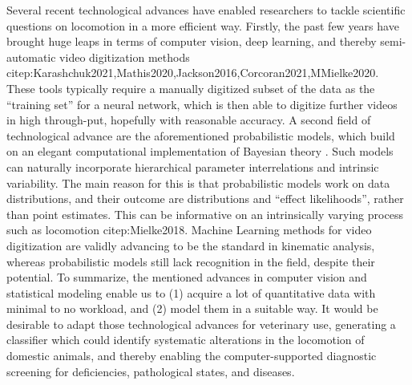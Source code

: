 Several recent technological advances have enabled researchers to tackle scientific questions on locomotion in a more efficient way.
Firstly, the past few years have brought huge leaps in terms of computer vision, deep learning, and thereby semi-automatic video digitization methods citep:Karashchuk2021,Mathis2020,Jackson2016,Corcoran2021,MMielke2020.
These tools typically require a manually digitized subset of the data as the ``training set'' for a neural network, which is then able to digitize further videos in high through-put, hopefully with reasonable accuracy.
A second field of technological advance are the aforementioned probabilistic models, which build on an elegant computational implementation of Bayesian theory \citep[Markov Chain Monte Carlo / MCMC sampling, \textit{cf.}][]{McElreath2018,Gelman2013,vandeSchoot2021}.
Such models can naturally incorporate hierarchical parameter interrelations and intrinsic variability.
The main reason for this is that probabilistic models work on data distributions, and their outcome are distributions and ``effect likelihoods'', rather than point estimates.
This can be informative on an intrinsically varying process such as locomotion citep:Mielke2018.
Machine Learning methods for video digitization are validly advancing to be the standard in kinematic analysis, whereas probabilistic models still lack recognition in the field, despite their potential.
To summarize, the mentioned advances in computer vision and statistical modeling enable us to (1) acquire a lot of quantitative data with minimal to no workload, and (2) model them in a suitable way.
It would be desirable to adapt those technological advances for veterinary use, generating a classifier which could identify systematic alterations in the locomotion of domestic animals, and thereby enabling the computer-supported diagnostic screening for deficiencies, pathological states, and diseases.


\bigskip

